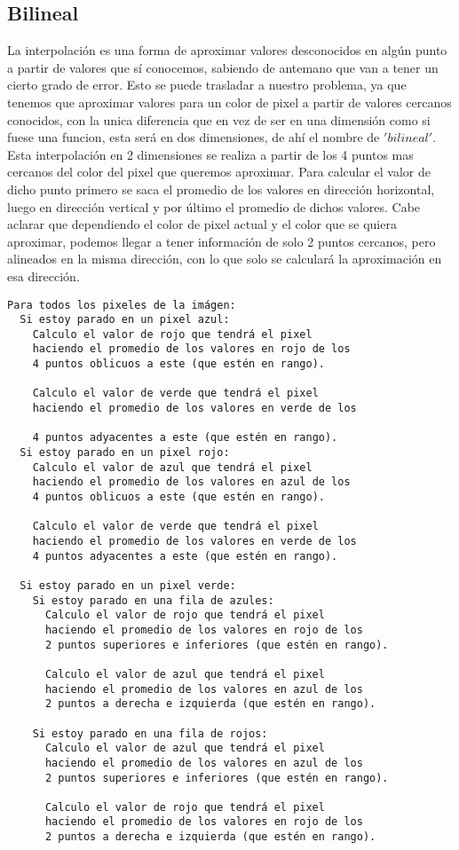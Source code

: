 \subsection{Bilineal}

La interpolación es una forma de aproximar valores desconocidos en algún punto a partir de valores que sí conocemos, sabiendo de antemano que van a tener un cierto grado de error. Esto se puede trasladar a nuestro problema, ya que tenemos que aproximar valores para un color de pixel a partir de valores cercanos conocidos, con la unica diferencia que en vez de ser en una dimensión como si fuese una funcion, esta será en dos dimensiones, de ahí el nombre de $'bilineal'$. Esta interpolación en 2 dimensiones se realiza a partir de los 4 puntos mas cercanos del color del pixel que queremos aproximar. Para calcular el valor de dicho punto primero se saca el promedio de los valores en dirección horizontal, luego en dirección vertical y por último el promedio de dichos valores. Cabe aclarar que dependiendo el color de pixel actual y el color que se quiera aproximar, podemos llegar a tener información de solo 2 puntos cercanos, pero alineados en la misma dirección, con lo que solo se calculará la aproximación en esa dirección.
\begin{verbatim}
Para todos los pixeles de la imágen:
  Si estoy parado en un pixel azul:
    Calculo el valor de rojo que tendrá el pixel 
    haciendo el promedio de los valores en rojo de los 
    4 puntos oblicuos a este (que estén en rango).
    
    Calculo el valor de verde que tendrá el pixel 
    haciendo el promedio de los valores en verde de los 

    4 puntos adyacentes a este (que estén en rango).
  Si estoy parado en un pixel rojo:
    Calculo el valor de azul que tendrá el pixel 
    haciendo el promedio de los valores en azul de los 
    4 puntos oblicuos a este (que estén en rango).
    
    Calculo el valor de verde que tendrá el pixel 
    haciendo el promedio de los valores en verde de los 
    4 puntos adyacentes a este (que estén en rango).

  Si estoy parado en un pixel verde:
    Si estoy parado en una fila de azules:
      Calculo el valor de rojo que tendrá el pixel 
      haciendo el promedio de los valores en rojo de los 
      2 puntos superiores e inferiores (que estén en rango).

      Calculo el valor de azul que tendrá el pixel 
      haciendo el promedio de los valores en azul de los 
      2 puntos a derecha e izquierda (que estén en rango).

    Si estoy parado en una fila de rojos:
      Calculo el valor de azul que tendrá el pixel 
      haciendo el promedio de los valores en azul de los 
      2 puntos superiores e inferiores (que estén en rango).

      Calculo el valor de rojo que tendrá el pixel 
      haciendo el promedio de los valores en rojo de los 
      2 puntos a derecha e izquierda (que estén en rango).  
\end{verbatim}



